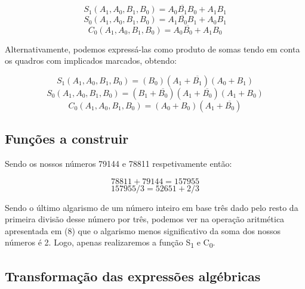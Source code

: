 \documentclass[a4paper,12pt]{article}
\begin{document}
\begin{equation}
S_1(A_1,A_0,B_1,B_0) = A_0\overline{B_1}B_0 + A_1B_1
\end{equation}
\begin{equation}
S_0(A_1,A_0,B_1,B_0) = A_1\overline{B_0}B_1 + A_0B_1
\end{equation}
\begin{equation}
C_0(A_1,A_0,B_1,B_0) = A_0\overline{B_0} + A_1B_0
\end{equation}

Alternativamente, podemos expressá-las como produto de somas tendo em conta os quadros com implicados marcados, obtendo:


\begin{equation}
S_1(A_1,A_0,B_1,B_0) = (B_0)(A_1+\overline{B_1})(A_0+B_1)
\end{equation}
\begin{equation}
S_0(A_1,A_0,B_1,B_0) = (B_1+\overline{B_0})(A_1+\overline{B_0})(A_1+B_0)
\end{equation}
\begin{equation}
C_0(A_1,A_0,B_1,B_0) = (A_0+B_0)(A_1+\overline{B_0})
\end{equation}

\pagebreak

\subsection{Funções a construir}

Sendo os nossos números 79144 e 78811 respetivamente então:

\begin{equation}
78811 + 79144 = 157955
\end{equation}
\begin{equation}
157955/3 = 52651 + 2/3
\end{equation}

Sendo o último algarismo de um número inteiro em base três dado pelo resto
da primeira divisão desse número por três, podemos ver na operação aritmética
apresentada em (8) que o algarismo menos significativo da soma dos nossos números
é 2. Logo, apenas realizaremos a função S\textsubscript{1} e C\textsubscript{0}. 

\subsection{Transformação das expressões algébricas}
\end{document}
